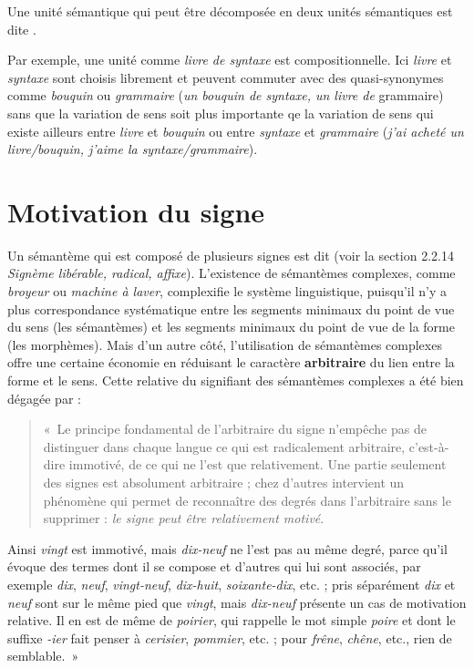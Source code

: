 {Une unité sémantique qui peut être décomposée en deux unités sémantiques est dite .}

Par exemple, une unité comme \textit{livre de syntaxe} est compositionnelle. Ici \textit{livre} et \textit{syntaxe} sont choisis librement et peuvent commuter avec des quasi-synonymes comme \textit{bouquin} ou \textit{grammaire} (\textit{un bouquin de syntaxe, un livre de} grammaire) sans que la variation de sens soit plus importante qe la variation de sens qui existe ailleurs entre \textit{livre} et \textit{bouquin} ou entre \textit{syntaxe} et \textit{grammaire} (\textit{j’ai acheté un livre/bouquin, j’aime la syntaxe/grammaire}).

\section{Motivation du signe}\label{sec:2.3.2}

Un sémantème qui est composé de plusieurs signes est dit  (voir la section\textstyleTermesapprofondissement{} 2.2.14 \textit{Signème libérable, radical, affixe}). L’existence de sémantèmes complexes, comme \textit{broyeur} ou \textit{machine à laver}, complexifie le système linguistique, puisqu’il n’y a plus correspondance systématique entre les segments minimaux du point de vue du sens (les sémantèmes) et les segments minimaux du point de vue de la forme (les morphèmes). Mais d’un autre côté, l’utilisation de sémantèmes complexes offre une certaine économie en réduisant le caractère \textbf{arbitraire} du lien entre la forme et le sens. Cette relative  du signifiant des sémantèmes complexes a été bien dégagée par \citet[180]{saussure1916cours} :

\begin{quote}
    «~Le principe fondamental de l’arbitraire du signe n’empêche pas de distinguer dans chaque langue ce qui est radicalement arbitraire, c’est-à-dire immotivé, de ce qui ne l’est que relativement. Une partie seulement des signes est absolument arbitraire ; chez d’autres intervient un phénomène qui permet de reconnaître des degrés dans l’arbitraire sans le supprimer : \textit{le signe peut être relativement motivé}.
\end{quote}

Ainsi \textit{vingt} est immotivé, mais \textit{dix-neuf} ne l’est pas au même degré, parce qu’il évoque des termes dont il se compose et d’autres qui lui sont associés, par exemple \textit{dix}, \textit{neuf}, \textit{vingt-neuf}, \textit{dix-huit}, \textit{soixante-dix}, etc. ; pris séparément \textit{dix} et \textit{neuf} sont sur le même pied que \textit{vingt}, mais \textit{dix-neuf} présente un cas de motivation relative. Il en est de même de \textit{poirier}, qui rappelle le mot simple \textit{poire} et dont le suffixe \textit{{}-ier} fait penser à \textit{cerisier}, \textit{pommier}, etc. ; pour \textit{frêne}, \textit{chêne}, etc., rien de semblable.~»

